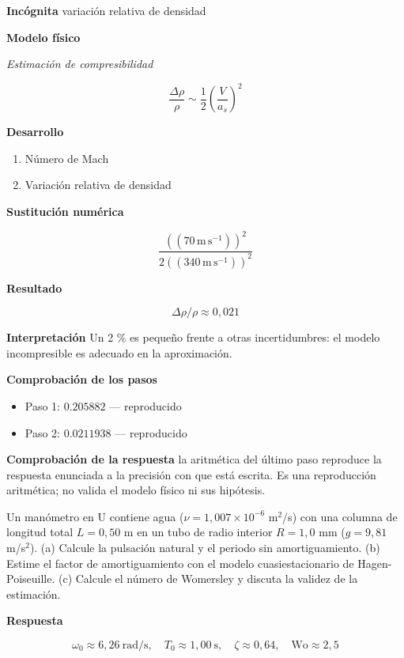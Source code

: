 \documentclass[10pt,openany]{book}
\begin{document}
\noindent\textbf{Incógnita}
variación relativa de densidad

\noindent\textbf{Modelo físico}

\noindent\textit{Estimación de compresibilidad}

\[
\frac{\Delta\rho}{\rho} \sim \frac{1}{2}\left(\frac{V}{a_s}\right)^{2}
\]

\noindent\textbf{Desarrollo}
\begin{enumerate}
\item
Número de Mach
\item
Variación relativa de densidad
\end{enumerate}

\noindent\textbf{Sustitución numérica}

\[
\frac{\left(\left(70\,\mathrm{m}\,\mathrm{s}^{-1}\right)\right)^{2}}{2 \left(\left(340\,\mathrm{m}\,\mathrm{s}^{-1}\right)\right)^{2}}
\]

\noindent\textbf{Resultado}

\[
\Delta\rho/\rho \approx 0{,}021
\]

\noindent\textbf{Interpretación}
Un 2 \% es pequeño frente a otras incertidumbres: el modelo incompresible es adecuado en la aproximación.

\noindent\textbf{Comprobación de los pasos}
\begin{itemize}
\item Paso 1: $0.205882$ — reproducido
\item Paso 2: $0.0211938$ — reproducido
\end{itemize}

\noindent\textbf{Comprobación de la respuesta} la aritmética del último paso reproduce la respuesta enunciada a la precisión con que está escrita. Es una reproducción aritmética; no valida el modelo físico ni sus hipótesis.

Un manómetro en U contiene agua (\(\nu = 1{,}007\times 10^{-6}\) m\(^2\)/s) con una columna de longitud total \(L = 0{,}50\) m en un tubo de radio interior \(R = 1{,}0\) mm (\(g = 9{,}81\) m/s\(^2\)). (a) Calcule la pulsación natural y el periodo sin amortiguamiento. (b) Estime el factor de amortiguamiento con el modelo cuasiestacionario de Hagen-Poiseuille. (c) Calcule el número de Womersley y discuta la validez de la estimación.

\noindent\textbf{Respuesta}

\[
\omega_0 \approx 6{,}26\ \mathrm{rad/s},\quad T_0 \approx 1{,}00\ \mathrm{s},\quad \zeta \approx 0{,}64,\quad \mathrm{Wo} \approx 2{,}5
\]
\end{document}
